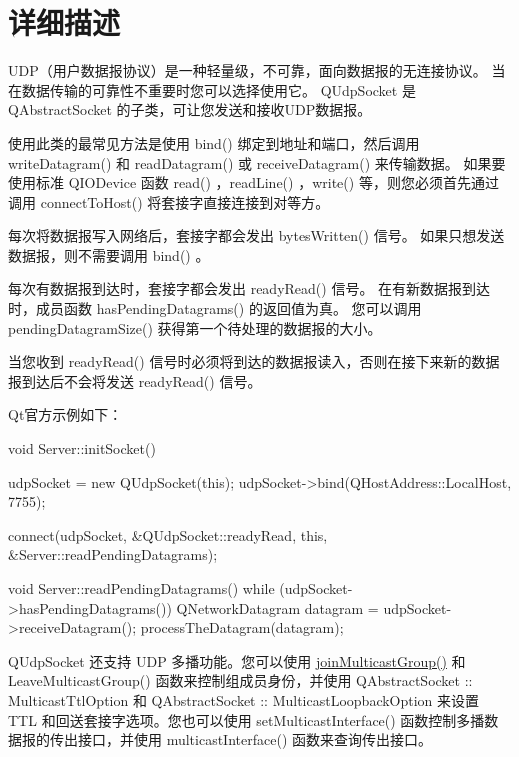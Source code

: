 
\section{详细描述}

UDP（用户数据报协议）是一种轻量级，不可靠，面向数据报的无连接协议。
 当在数据传输的可靠性不重要时您可以选择使用它。 
 QUdpSocket 是 QAbstractSocket 的子类，可让您发送和接收UDP数据报。

使用此类的最常见方法是使用 bind() 绑定到地址和端口，然后调用 writeDatagram() 和 readDatagram() 或 receiveDatagram() 来传输数据。 
如果要使用标准 QIODevice 函数 read() ，readLine() ，write() 等，则您必须首先通过调用 connectToHost() 将套接字直接连接到对等方。

每次将数据报写入网络后，套接字都会发出 bytesWritten() 信号。 如果只想发送数据报，则不需要调用 bind() 。

每次有数据报到达时，套接字都会发出 readyRead() 信号。 在有新数据报到达时，成员函数 hasPendingDatagrams() 的返回值为真。
您可以调用 pendingDatagramSize() 获得第一个待处理的数据报的大小。

\begin{notice}
当您收到 readyRead() 信号时必须将到达的数据报读入，否则在接下来新的数据报到达后不会将发送 readyRead() 信号。
\end{notice}

Qt官方示例如下：

\begin{cppcode}
 void Server::initSocket()
 {
     udpSocket = new QUdpSocket(this);
     udpSocket->bind(QHostAddress::LocalHost, 7755);

     connect(udpSocket, &QUdpSocket::readyRead,
             this, &Server::readPendingDatagrams);
 }

 void Server::readPendingDatagrams()
 {
     while (udpSocket->hasPendingDatagrams()) {
         QNetworkDatagram datagram = udpSocket->receiveDatagram();
         processTheDatagram(datagram);
     }
 }
\end{cppcode}

QUdpSocket 还支持 UDP 多播功能。您可以使用 \href{https://github.com/JackLovel/QtDocumentCN/blob/master/Src/U/QUdpSocket/QUdpSocket.md#bool-qudpsocketjoinmulticastgroupconst-qhostaddress-groupaddress}{joinMulticastGroup()}  和 LeaveMulticastGroup() 函数来控制组成员身份，并使用 QAbstractSocket :: MulticastTtlOption 和 QAbstractSocket :: MulticastLoopbackOption 来设置 TTL 和回送套接字选项。您也可以使用 setMulticastInterface() 函数控制多播数据报的传出接口，并使用 multicastInterface() 函数来查询传出接口。

